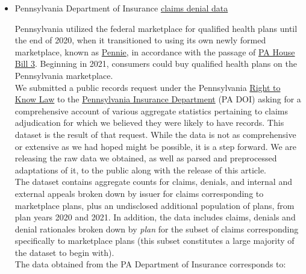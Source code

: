 \documentclass[12pt, a4paper,twoside]{report}
\theoremstyle{plain} %
\theoremstyle{definition} %
\theoremstyle{remark} %
\numberwithin{equation}{chapter}
\begin{document}
\begin{itemize}
\begin{tcolorbox}
			\end{tcolorbox}
		
			\item Pennsylvania Department of Insurance \href{https://repos.persius.org/public-records/data/claims_denials/pa/readme.html}{claims denial data}
			
			\begin{tcolorbox}
			Pennsylvania utilized the federal marketplace for qualified health plans until the end of 2020, when it transitioned to using its own newly formed marketplace, known as \href{https://pennie.com/}{Pennie}, in accordance with the passage of \href{https://www.legis.state.pa.us/cfdocs/billinfo/billinfo.cfm?syear=2019&sind=0&body=H&type=B&bn=3}{PA House Bill 3}. Beginning in 2021, consumers could buy qualified health plans on the Pennsylvania marketplace.\\
			
			We submitted a public records request under the Pennsylvania \href{https://www.insurance.pa.gov/right-to-know-law/Pages/default.aspx}{Right to Know Law} to the \href{https://www.insurance.pa.gov/Pages/default.aspx}{Pennsylvania Insurance Department} (PA DOI) asking for a comprehensive account of various aggregate statistics pertaining to claims adjudication for which we believed they were likely to have records. This dataset is the result of that request. While the data is not as comprehensive or extensive as we had hoped might be possible, it is a step forward. We are releasing the raw data we obtained, as well as parsed and preprocessed adaptations of it, to the public along with the release of this article.\\
			
			The dataset contains aggregate counts for claims, denials, and internal and external appeals broken down by issuer for claims corresponding to marketplace plans, plus an undisclosed additional population of plans, from plan years 2020 and 2021. In addition, the data includes claims, denials and denial rationales broken down by \emph{plan} for the subset of claims corresponding specifically to marketplace plans (this subset constitutes a large majority of the dataset to begin with).\\
			
			The data obtained from the PA Department of Insurance corresponds to:
			

\end{tcolorbox}
\end{itemize}
\end{document}
